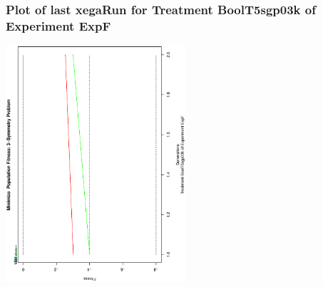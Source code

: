  \begin{frame}
 \frametitle{ Plot of last xegaRun for Treatment BoolT5sgp03k of Experiment ExpF }
 \begin{center}
\includegraphics[width=0.5\textwidth, angle=-90]
{ExpFPlotPopStatsFigure001.eps}
 \end{center}
 \label{report/ExpFPlotPopStatsFigure001.eps}  
 \end{frame}


